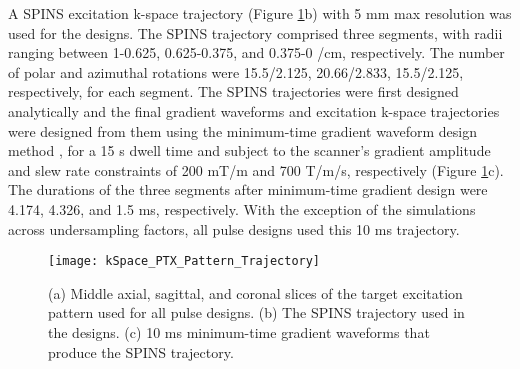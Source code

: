 \par A SPINS excitation k-space trajectory \cite{malik2012tailored} (Figure \ref{fig:Target}b) with 5 mm max resolution was used for the designs. 
The SPINS trajectory comprised three segments, with radii ranging between 1-0.625, 0.625-0.375, and 0.375-0 /cm, respectively.
The number of polar and azimuthal rotations were 15.5/2.125, 20.66/2.833, 15.5/2.125, respectively, for each segment.
The SPINS trajectories were first designed analytically and the final gradient waveforms and excitation k-space trajectories were designed from them 
using the minimum-time gradient waveform design method \cite{lustig2008fast}, 
for a 15 {\textmu}s dwell time and subject to the scanner's gradient amplitude and slew rate constraints of 200 mT/m and 700 T/m/s, respectively (Figure \ref{fig:Target}c). 
The durations of the three segments after minimum-time gradient design were 4.174, 4.326, and 1.5 ms, respectively.
With the exception of the simulations across undersampling factors, 
all pulse designs used this 10 ms trajectory.

\begin{figure}
	\centering
	\texttt{[image: kSpace\_PTX\_Pattern\_Trajectory]}
	\caption{(a) Middle axial, sagittal, and coronal slices of the target excitation pattern used for all pulse designs. 
	(b) The SPINS trajectory used in the designs. 
	(c) 10 ms minimum-time gradient waveforms that produce the SPINS trajectory.}
	\label{fig:Target}
\end{figure}

